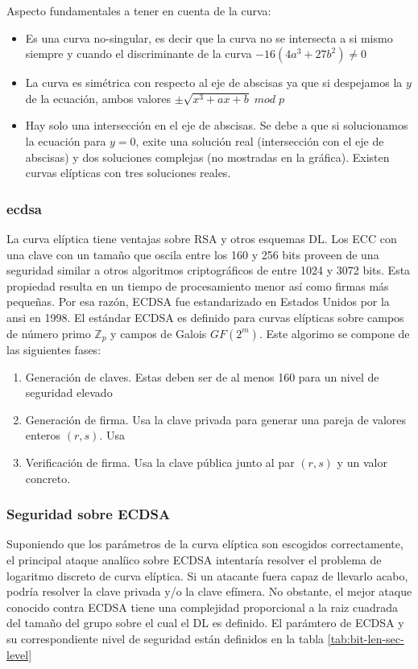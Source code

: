 Aspecto fundamentales a tener en cuenta de la curva:

\begin{itemize}
    \item Es una curva no-singular, es decir que la curva no se intersecta a si mismo siempre y cuando el discriminante de la curva
    $-16(4a^3 + 27b^2) \not = 0$
    \item La curva es simétrica con respecto al eje de abscisas ya que si despejamos la $y$ de la ecuación, ambos valores
    $\pm\sqrt{x^3 + ax + b} \; mod \; p$ 
    \item Hay solo una intersección en el eje de abscisas. Se debe a que si solucionamos la ecuación para $y = 0$, exite una 
    solución real (intersección con el eje de abscisas) y dos soluciones complejas (no mostradas en la gráfica). Existen curvas 
    elípticas con tres soluciones reales.
\end{itemize}

\subsubsection{\acrfull{ecdsa}}
\label{subsec:ecdsa}

La curva elíptica tiene ventajas sobre RSA y otros esquemas DL. Los ECC con una clave con un tamaño que oscila entre los 160 y 256
bits proveen de una seguridad similar a otros algoritmos criptográficos de entre 1024 y 3072 bits. Esta propiedad resulta en un 
tiempo de procesamiento menor así como firmas más pequeñas. Por esa razón, ECDSA fue estandarizado en Estados Unidos por la 
\acrshort{ansi} en 1998. 
El estándar ECDSA es definido para curvas elípticas sobre campos de número primo $\mathbb{Z}_{p}$ y campos de Galois $GF(2^m)$.
Este algorimo se compone de las siguientes fases:

\begin{enumerate}
    \item Generación de claves. Estas deben ser de al menos 160 para un nivel de seguridad elevado
    \item Generación de firma. Usa la clave privada para generar una pareja de valores enteros $(r,s)$. Usa 
    \item Verificación de firma. Usa la clave pública junto al par $(r,s)$ y un valor concreto.
\end{enumerate}

\subsubsection{Seguridad sobre ECDSA}
Suponiendo que los parámetros de la curva elíptica son escogidos correctamente, el principal ataque analíico sobre ECDSA intentaría
resolver el problema de logaritmo discreto de curva elíptica. Si un atacante fuera capaz de llevarlo acabo, podría resolver la 
clave privada y/o la clave efímera. No obstante, el mejor ataque conocido contra ECDSA tiene una complejidad proporcional a la 
raiz cuadrada del tamaño del grupo sobre el cual el DL es definido. El parámtero de ECDSA y su correspondiente nivel de seguridad 
están definidos en la tabla \ref{tab:bit-len-sec-level}

